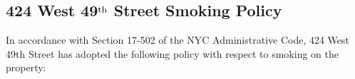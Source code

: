 



\thispagestyle{empty}

\begin{center}
\section*{{\huge 424 West 49$^{\textrm{\small th}}$ Street Smoking Policy}}
\end{center}


In accordance with Section 17-502 of the NYC Administrative Code, 424 West 49th Street has adopted the following policy with respect to smoking on the property:

\vspace{1cm}

